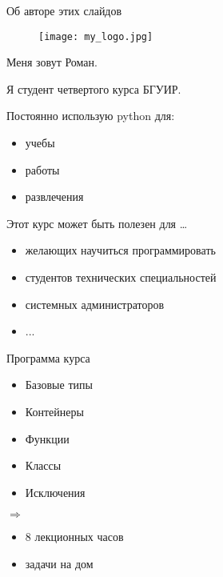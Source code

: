 \documentclass[hyperref={pdftex,unicode}]{beamer}
\begin{document}
\begin{frame}
  \maketitle
\end{frame}

\begin{frame}{Об авторе этих слайдов}
  \begin{minipage}{0.3\linewidth}
    \begin{figure}[H]
      \texttt{[image: my\_logo.jpg]}
    \end{figure}
  \end{minipage}
  \hfill
  \begin{minipage}{0.6\linewidth}
    Меня зовут Роман. 
    
    Я студент четвертого курса БГУИР.

    Постоянно использую python для:
    \begin{itemize}
      \item учебы
      \item работы
      \item развлечения
    \end{itemize}
  \end{minipage}
\end{frame}

\begin{frame}{Этот курс может быть полезен для \dots}
  \begin{itemize}
    \item желающих научиться программировать
    \item студентов технических специальностей
    \item системных администраторов
    \item ...
  \end{itemize}
\end{frame}

\begin{frame}{Программа курса}
  \begin{minipage}{0.4\linewidth}
    \begin{itemize}
    \item Базовые типы
    \item Контейнеры
    \item Функции
    \item Классы
    \item Исключения
    \end{itemize}
  \end{minipage}
  $ \Longrightarrow $
  \hfill
  \begin{minipage}{0.4\linewidth}
    \begin{itemize}  
    \item 8 лекционных часов
    \item задачи на дом
   \end{itemize}
  \end{minipage}
\end{frame}
\end{document}
